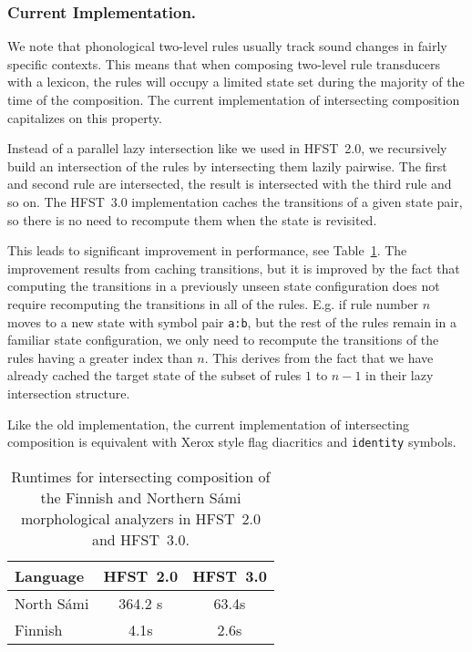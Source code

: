 \documentclass{llncs}
\begin{document}
\subsubsection{Current Implementation.}
We note that phonological two-level rules usually track sound changes in fairly
specific contexts. This means that when composing two-level rule
transducers with a lexicon, the rules will occupy a limited state set
during the majority of the time of the composition. The current
implementation of intersecting composition capitalizes on this
property.

Instead of a parallel lazy intersection like we used in HFST~2.0, we
recursively build an intersection of the rules by intersecting them
lazily pairwise. The first and second rule are intersected, the result
is intersected with the third rule and so on. The HFST~3.0 implementation 
caches the transitions of a given state pair, so there
is no need to recompute them when the state is revisited.

This leads to significant improvement in performance, see Table~\ref{tab:run_times}. The improvement
results from caching transitions, but it is improved by the fact that
computing the transitions in a previously unseen state configuration
does not require recomputing the transitions in all of the
rules. E.g. if rule number $n$ moves to a new state with symbol pair
{\tt a:b}, but the rest of the rules remain in a familiar state
configuration, we only need to recompute the transitions of the rules
having a greater index than $n$. This derives from the fact that we have
already cached the target state of the subset of rules $1$ to $n-1$ in
their lazy intersection structure.

Like the old implementation, the current implementation of
intersecting composition is equivalent with Xerox style flag diacritics
and {\tt identity} symbols.

\begin{table}[htb!]
\begin{center}
\caption{Runtimes for intersecting composition of the Finnish and Northern S\'{a}mi morphological analyzers in HFST~2.0 and HFST~3.0.}
  \label{tab:run_times}
\begin{tabular}{l c c}
\hline
Language  & HFST~2.0 & HFST~3.0\\
\hline
North S\'{a}mi  & 364.2 s & 63.4s \\
Finnish   &  4.1s  & 2.6s   \\
\hline
\end{tabular}
\end{center}
\end{table}
\end{document}
